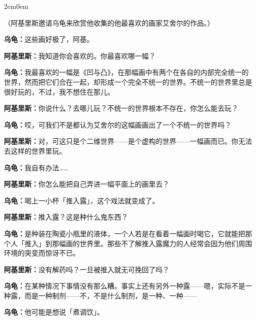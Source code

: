 \documentclass[
  12pt,
  twoside,
  openright,
  oldfontcommands,
]{memoir}
\newcommand{\dialogname}[1]{{\heifamily\bfseries #1}}
\begin{document}
\begin{adjustwidth}{2em}{0em}

（阿基里斯邀请乌龟来欣赏他收集的他最喜欢的画家艾舍尔的作品。）

\dialogname{乌龟：}这些画好极了，阿基。

\dialogname{阿基里斯：}我知道你会喜欢的。你最喜欢哪一幅？

\dialogname{乌龟：}我最喜欢的一幅是《凹与凸》，在那幅画中有两个在各自的内部完全统一的世界，然而把它们合在一起，却形成一个完全不统一的世界。不统一的世界里总是很好玩的，不过，我不想住在那儿。

\dialogname{阿基里斯：}你说什么？去哪儿玩？不统一的世界根本不存在，你怎么能去玩？

\dialogname{乌龟：}哎，可我们不是都认为艾舍尔的这幅画画出了一个不统一的世界吗？

\dialogname{阿基里斯：}对，可这只是个二维世界------是个虚构的世界------一幅画而已。你无法去这样的世界里玩。

\dialogname{乌龟：}我自有办法\ldots\ldots{}

\dialogname{阿基里斯：}你怎么能把自己弄进一幅平面上的画里去？

\dialogname{乌龟：}喝上一小杯「推入露」，这个戏法就变成了。

\dialogname{阿基里斯：}推入露？这是种什么鬼东西？

\dialogname{乌龟：}是种装在陶瓷小瓶里的液体，一个人若是在看着一幅画时喝它，它就能把那个人「推入」到那幅画的世界里。那些不了解推入露魔力的人经常会因为他们周围环境的突变而惊讶不已。

\dialogname{阿基里斯：}没有解药吗？一旦被推入就无可挽回了吗？

\dialogname{乌龟：}在某种情况下事情没有那么糟。事实上还有另外一种露------嗯，实际不是一种露，而是一种制剂------不，不是什么制剂，是一种、一种------

\end{adjustwidth}

\dialogname{乌龟：}他可能是想说「煮调饮」。
\end{document}
